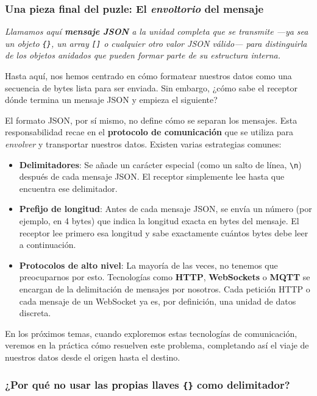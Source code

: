 \begin{note}
\subsubsection*{Una pieza final del puzle: El \emph{envoltorio} del mensaje}

\textit{Llamamos aquí \textbf{mensaje JSON} a la unidad completa que se transmite ---ya sea un objeto \texttt{\{\}}, un array \texttt{[]} o cualquier otro valor JSON válido--- para distinguirla de los objetos anidados que pueden formar parte de su estructura interna.}

Hasta aquí, nos hemos centrado en cómo formatear nuestros datos como una secuencia de bytes lista para ser enviada. Sin embargo, ¿cómo sabe el receptor dónde termina un mensaje JSON y empieza el siguiente?

El formato JSON, por sí mismo, no define cómo se separan los mensajes. Esta responsabilidad recae en el \textbf{protocolo de comunicación} que se utiliza para \emph{envolver} y transportar nuestros datos. Existen varias estrategias comunes:

\begin{itemize}
    \item \textbf{Delimitadores}: Se añade un carácter especial (como un salto de línea, \texttt{\textbackslash n}) después de cada mensaje JSON. El receptor simplemente lee hasta que encuentra ese delimitador.
    \item \textbf{Prefijo de longitud}: Antes de cada mensaje JSON, se envía un número (por ejemplo, en 4 bytes) que indica la longitud exacta en bytes del mensaje. El receptor lee primero esa longitud y sabe exactamente cuántos bytes debe leer a continuación.
    \item \textbf{Protocolos de alto nivel}: La mayoría de las veces, no tenemos que preocuparnos por esto. Tecnologías como \textbf{HTTP}, \textbf{WebSockets} o \textbf{MQTT} se encargan de la delimitación de mensajes por nosotros. Cada petición HTTP o cada mensaje de un WebSocket ya es, por definición, una unidad de datos discreta.
\end{itemize}

En los próximos temas, cuando exploremos estas tecnologías de comunicación, veremos en la práctica cómo resuelven este problema, completando así el viaje de nuestros datos desde el origen hasta el destino.

\subsubsection*{¿Por qué no usar las propias llaves \texttt{\{\}} como delimitador?}


\end{note}
